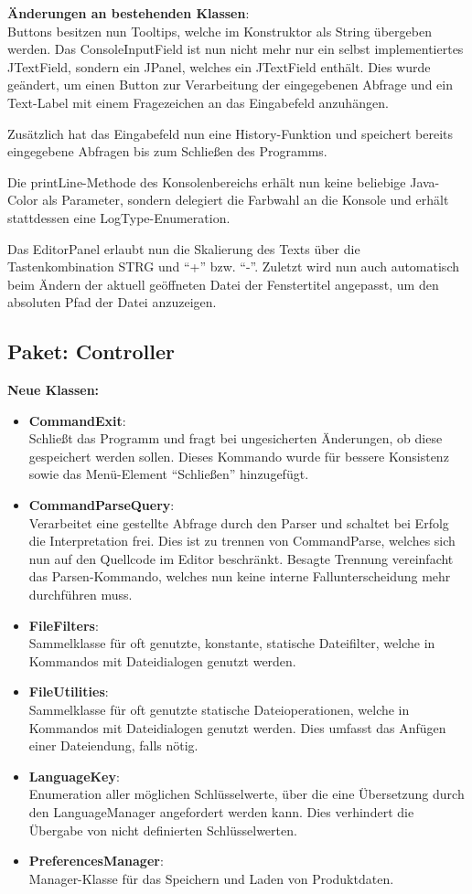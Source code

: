\documentclass[parskip=full,11pt,twoside]{scrartcl}
\begin{document}
\textbf{Änderungen an bestehenden Klassen}:\\
Buttons besitzen nun Tooltips, welche im Konstruktor als String übergeben werden. Das ConsoleInputField ist nun nicht mehr nur ein selbst implementiertes JTextField, sondern ein JPanel, welches ein JTextField enthält. Dies wurde geändert, um einen Button zur Verarbeitung der eingegebenen Abfrage und ein Text-Label mit einem Fragezeichen an das Eingabefeld anzuhängen.

Zusätzlich hat das Eingabefeld nun eine History-Funktion und speichert bereits eingegebene Abfragen bis zum Schließen des Programms.

Die printLine-Methode des Konsolenbereichs erhält nun keine beliebige Java-Color als Parameter, sondern delegiert die Farbwahl an die Konsole und erhält stattdessen eine LogType-Enumeration.

Das EditorPanel erlaubt nun die Skalierung des Texts über die Tastenkombination STRG und \enquote{+} bzw. \enquote{-}. Zuletzt wird nun auch automatisch beim Ändern der aktuell geöffneten Datei der Fenstertitel angepasst, um den absoluten Pfad der Datei anzuzeigen.

\subsection{Paket: Controller}
\textbf{Neue Klassen:}
\begin{itemize}
	\item \textbf{CommandExit}:\\
	Schließt das Programm und fragt bei ungesicherten Änderungen, ob diese gespeichert werden sollen. Dieses Kommando wurde für bessere Konsistenz sowie das Menü-Element \enquote{Schließen} hinzugefügt.
	\item \textbf{CommandParseQuery}:\\
	Verarbeitet eine gestellte Abfrage durch den Parser und schaltet bei Erfolg die Interpretation frei. Dies ist zu trennen von CommandParse, welches sich nun auf den Quellcode im Editor beschränkt. Besagte Trennung vereinfacht das Parsen-Kommando, welches nun keine interne Fallunterscheidung mehr durchführen muss.
	\item \textbf{FileFilters}:\\
	Sammelklasse für oft genutzte, konstante, statische Dateifilter, welche in Kommandos mit Dateidialogen genutzt werden.
	\item \textbf{FileUtilities}:\\
	Sammelklasse für oft genutzte statische Dateioperationen, welche in Kommandos mit Dateidialogen genutzt werden. Dies umfasst das Anfügen einer Dateiendung, falls nötig.
	\item \textbf{LanguageKey}:\\
	Enumeration aller möglichen Schlüsselwerte, über die eine Übersetzung durch den LanguageManager angefordert werden kann. Dies verhindert die Übergabe von nicht definierten Schlüsselwerten.
	\item \textbf{PreferencesManager}:\\
	Manager-Klasse für das Speichern und Laden von Produktdaten.
\end{itemize}
\end{document}

